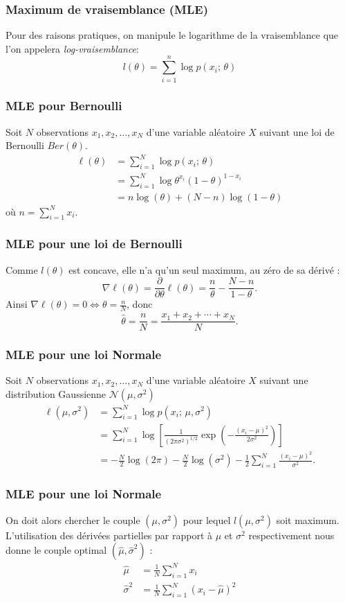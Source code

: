 \begin{frame}
  \frametitle{Maximum de vraisemblance (MLE)}
  Pour des raisons pratiques, on manipule le logarithme de la vraisemblance que l'on appelera \textit{log-vraisemblance}:
  \[
      l(\theta) = \sum_{i=1}^n \log p(x_i; \, \theta)
  \]
\end{frame}

\begin{frame}
  \frametitle{MLE pour Bernoulli}
Soit $N$ observations $x_1,x_2,\ldots,x_N$ d'une variable aléatoire $X$ suivant une loi de Bernoulli $Ber(\theta)$.
\begin{align*}
\ell(\theta) 	&= \sum_{i=1}^N \log p(x_i; \, \theta) \\
				&= \sum_{i=1}^N \log \theta^{x_i}(1-\theta)^{1-x_i}\\
				&= n\log(\theta)+(N-n)\log(1-\theta)
\end{align*} 
où $n=\sum_{i=1}^N x_i$.\\ 
\end{frame}

\begin{frame}
  \frametitle{MLE pour une loi de Bernoulli}
Comme $l(\theta)$ est concave, elle n'a qu'un seul maximum, au zéro de sa dérivé :
$$\nabla \ell(\theta)=\frac{\partial}{\partial\theta} \ell(\theta) = \frac{n}{\theta}-\frac{N-n}{1-\theta}.$$  
Ainsi $\nabla \ell(\theta) = 0 \Longleftrightarrow \theta =\frac{n}{N}$, donc
$$\hat{\theta} = \frac{n}{N} = \frac{x_1+x_2+\cdots+x_N}{N}.$$
\end{frame}

\begin{frame}
  \frametitle{MLE pour une loi Normale}
  Soit $N$ observations $x_1,x_2,\ldots,x_N$ d'une variable aléatoire $X$ suivant une distribution Gaussienne $\mathcal{N}(\mu,\sigma^2)$
\begin{align*}
\ell(\mu,\sigma^2) 	&= \sum_{i=1}^N \log p(x_i; \, \mu,\sigma^2) \\
				&= \sum_{i=1}^N \log\left[ \frac{1}{(2\pi\sigma^2)^{1/2}}\exp\left(-\frac{(x_i-\mu)^2}{2\sigma^2}\right)\right]\\
				&= -\frac{N}{2}\log(2\pi)-\frac{N}{2}\log(\sigma^2)-\frac{1}{2}\sum_{i=1}^N \frac{(x_i-\mu)^2}{\sigma^2}.				
\end{align*} 
\end{frame}

\begin{frame}
  \frametitle{MLE pour une loi Normale}
  On doit alors chercher le couple $(\mu, \sigma^2)$ pour lequel $l(\mu,\sigma^2)$ soit maximum. L'utilisation des dérivées partielles par rapport à $\mu$ et $\sigma^2$ respectivement nous donne le couple optimal $(\hat{\mu},\hat{\sigma}^2)$ :
\begin{align*}
\hat{\mu}&=\frac{1}{N}\sum_{i=1}^N x_i \\
\hat{\sigma}^2&=\frac{1}{N}\sum_{i=1}^N \left(x_i-\hat{\mu}\right)^2
\end{align*}
\end{frame}
